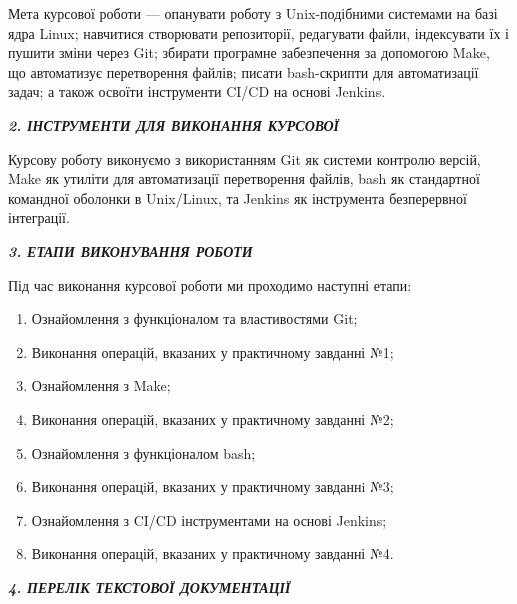\documentclass[a4paper,12pt]{article}
\begin{document}
  \noindent
  Мета курсової роботи — опанувати роботу з Unix-подібними системами на базі ядра Linux; навчитися створювати репозиторії, редагувати файли, індексувати їх і пушити зміни через Git; збирати програмне забезпечення за допомогою Make, що автоматизує перетворення файлів; писати bash-скрипти для автоматизації задач; а також освоїти інструменти CI/CD на основі Jenkins.

  \vspace{1em}

  \begin{center}
    \label{sec:tools}%
  \textbf{\textit{2. ІНСТРУМЕНТИ ДЛЯ ВИКОНАННЯ КУРСОВОЇ}}
  \end{center}

  \noindent
  Курсову роботу виконуємо з використанням Git як системи контролю версій, Make як утиліти для автоматизації перетворення файлів, bash як стандартної командної оболонки в Unix/Linux, та Jenkins як інструмента безперервної інтеграції.

  \vspace{1em}

  \begin{center}
    \label{sec:stages}%
  \textbf{\textit{3. ЕТАПИ ВИКОНУВАННЯ РОБОТИ}}
  \end{center}

  \noindent
  Під час виконання курсової роботи ми проходимо наступні етапи:

  \begin{enumerate}
    \item Ознайомлення з функціоналом та властивостями Git;
    \item Виконання операцій, вказаних у практичному завданні №1;
    \item Ознайомлення з Make;
    \item Виконання операцій, вказаних у практичному завданні №2;
    \item Ознайомлення з функціоналом bash;
    \item Виконання операцiй, вказаних у практичному завданнi №3;
    \item Ознайомлення з CI/CD інструментами на основі Jenkins;
    \item Виконання операцій, вказаних у практичному завданні №4.
  \end{enumerate}

  \vspace{1em}

  \begin{center}
    \label{sec:docs}%
  \textbf{\textit{4. ПЕРЕЛІК ТЕКСТОВОЇ ДОКУМЕНТАЦІЇ}}
  \end{center}
\end{document}
